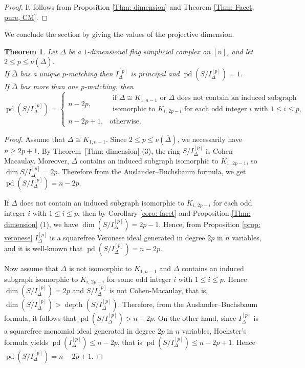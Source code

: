 \documentclass[12pt]{amsart}
\newtheorem{Theorem}{Theorem}[section]
\begin{document}
\begin{proof}
    It follows from Proposition  \ref{Thm: dimension} and Theorem \ref{Thm: Facet, pure, CM}.
\end{proof}
We conclude the section by giving the values of the projective dimension.
\begin{Theorem}\label{Thm: pd}
Let $\Delta$ be a $1$-dimensional flag simplicial complex on $[n]$, and let $2 \leq p \leq \nu(\overline{\Delta})$. \\
If $\overline{\Delta}$ has a unique $p$-matching then $I_{\Delta}^{[p]}$ is principal and $\operatorname{pd}(S/I_{\Delta}^{[p]})=1$.\\
If $\overline{\Delta}$ has more than one $p$-matching, then
\[
\operatorname{pd}(S/I_{\Delta}^{[p]})=
\begin{cases}
n-2p, &
\begin{array}{l}
\text{if } \Delta \cong K_{1,n-1} \text{ or } \Delta \text{ does not contain an induced subgraph}\\
\text{isomorphic to } K_{i,\,2p-i} \text{ for each odd integer } i \text{ with } 1\le i\le p,
\end{array}
\\[10pt]
n-2p+1, & \text{otherwise}.
\end{cases}
\]
\end{Theorem}

\begin{proof}
    Assume that $\Delta \cong K_{1,n-1}$. Since $2 \leq p \leq \nu(\overline{\Delta})$, we necessarily have $n\geq 2p+1$. By Theorem~\ref{Thm: dimension} (3), the ring $S/I_{\Delta}^{[p]}$ is Cohen--Macaulay. Moreover, $\Delta$ contains an induced subgraph isomorphic to $K_{1,\,2p-1}$, so $\dim S/I_{\Delta}^{[p]}= 2p$. Therefore from the Auslander--Buchsbaum formula, we get $\operatorname{pd}(S/I_{\Delta}^{[p]}) = n-2p$.

If $\Delta$ does not contain an induced subgraph isomorphic to $K_{i,\,2p-i}$ for each odd integer $i$ with $1 \le i \le p$, then by Corollary \ref{coro: facet} and Proposition \ref{Thm: dimension} (1), we have $\operatorname{dim}(S/I_{\Delta}^{[p]}) = 2p-1$. Hence, from Proposition \ref{prop: veronese}  $I_{\Delta}^{[p]}$ is a squarefree Veronese ideal generated in degree $2p$ in $n$ variables, and it is well-known that $\operatorname{pd}(S/I_{\Delta}^{[p]}) = n-2p$.

Now assume that $\Delta$ is not isomorphic to $K_{1,n-1}$ and $\Delta$ contains an induced subgraph isomorphic to $K_{i,\,2p-i}$ for some odd integer $i$ with $1 \le i \le p$. Hence  $\operatorname{dim}(S/I_{\Delta}^{[p]}) = 2p$ and $S/I_{\Delta}^{[p]}$ is not Cohen-Macaulay, that is, $\operatorname{dim}(S/I_{\Delta}^{[p]})>\operatorname{depth}(S/I_{\Delta}^{[p]})$. Therefore, from the Auslander--Buchsbaum formula, it follows that $\operatorname{pd}(S/I_{\Delta}^{[p]}) > n-2p$. On the other hand, since $I_{\Delta}^{[p]}$ is a squarefree monomial ideal generated in degree $2p$ in $n$ variables, Hochster's formula yields $\operatorname{pd}(I_{\Delta}^{[p]}) \le n-2p$, that is $\operatorname{pd}(S/I_{\Delta}^{[p]}) \le n-2p+1$. Hence  $\operatorname{pd}(S/I_{\Delta}^{[p]}) = n-2p+1$.
\end{proof}
\end{document}
